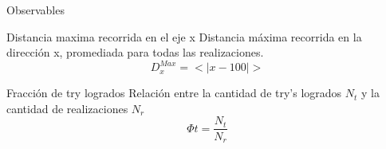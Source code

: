 \begin{frame}{Observables}
    \begin{block}{Distancia maxima recorrida en el eje x}
        Distancia máxima recorrida en la dirección x, promediada para todas las realizaciones.
        \begin{equation*}
            D_{x}^{Max} = <|x - 100|>
        \end{equation*}
    \end{block}
    \begin{block}{Fracción de try logrados}
        Relación entre la cantidad de try's logrados $N_t$ y la cantidad de realizaciones $N_r$
        \begin{equation*}
            \Phi t = \frac{N_t}{N_r}
        \end{equation*}
    \end{block}
\end{frame}